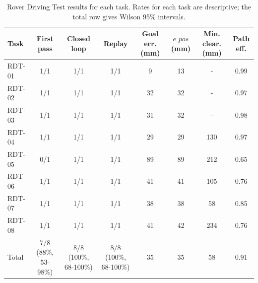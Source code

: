\begin{table}[htbp]
\centering
\caption{Rover Driving Test results for each task. Rates for each task are descriptive; the total row gives Wilson 95\% intervals.}
\label{tab:rdt_per_task}
\small
\begin{tabular}{lccccccc}
\toprule
Task & First pass & Closed loop & Replay & Goal err. (mm) & $e\_{pos}$ (mm) & Min. clear. (mm) & Path eff. \\
\midrule
RDT-01 & 1/1 & 1/1 & 1/1 & 9 & 13 & - & 0.99 \\
RDT-02 & 1/1 & 1/1 & 1/1 & 32 & 32 & - & 0.97 \\
RDT-03 & 1/1 & 1/1 & 1/1 & 31 & 32 & - & 0.98 \\
RDT-04 & 1/1 & 1/1 & 1/1 & 29 & 29 & 130 & 0.97 \\
RDT-05 & 0/1 & 1/1 & 1/1 & 89 & 89 & 212 & 0.65 \\
RDT-06 & 1/1 & 1/1 & 1/1 & 41 & 41 & 105 & 0.76 \\
RDT-07 & 1/1 & 1/1 & 1/1 & 38 & 38 & 58 & 0.85 \\
RDT-08 & 1/1 & 1/1 & 1/1 & 41 & 42 & 234 & 0.76 \\
Total & 7/8 (88\%, 53-98\%) & 8/8 (100\%, 68-100\%) & 8/8 (100\%, 68-100\%) & 35 & 35 & 58 & 0.91 \\
\bottomrule
\end{tabular}
\end{table}
